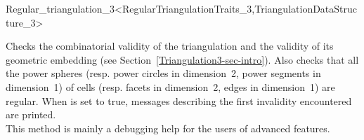 \begin{ccRefClass}{Regular_triangulation_3<RegularTriangulationTraits_3,TriangulationDataStructure_3>}
\begin{ccDebug}
{Checks the combinatorial validity of the triangulation and the
validity of its geometric embedding (see
Section~\ref{Triangulation3-sec-intro}). Also checks that all the
power spheres (resp. power circles in dimension~2, power segments in
dimension~1) of cells (resp. facets in dimension~2, edges in
dimension~1) are regular. When 
is set to true, messages describing the first invalidity encountered
are printed.\\ This method is mainly a debugging help for the users of
advanced features.
}

\end{ccDebug}




\end{ccRefClass}
